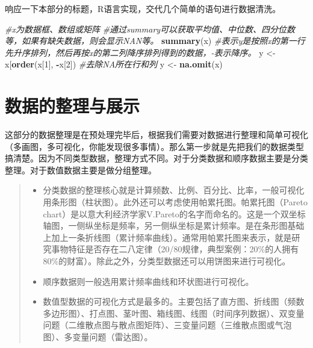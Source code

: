 \documentclass[]{ctexbook}
\newenvironment{Shaded}{\begin{snugshade}}{\end{snugshade}}
\newcommand{\CommentTok}[1]{\textcolor[rgb]{0.56,0.35,0.01}{\textit{#1}}}
\newcommand{\DecValTok}[1]{\textcolor[rgb]{0.00,0.00,0.81}{#1}}
\newcommand{\KeywordTok}[1]{\textcolor[rgb]{0.13,0.29,0.53}{\textbf{#1}}}
\newcommand{\NormalTok}[1]{#1}
\newcommand{\OperatorTok}[1]{\textcolor[rgb]{0.81,0.36,0.00}{\textbf{#1}}}
\newcommand{\StringTok}[1]{\textcolor[rgb]{0.31,0.60,0.02}{#1}}
\providecommand{\tightlist}{%
  \setlength{\itemsep}{0pt}\setlength{\parskip}{0pt}}
\begin{document}
响应一下本部分的标题，R语言实现，交代几个简单的语句进行数据清洗。

\begin{Shaded}
\begin{Highlighting}[]
\CommentTok{#x为数据框、数组或矩阵}
\CommentTok{#通过summary可以获取平均值、中位数、四分位数等，如果有缺失数据，则会显示NAN等。}
\KeywordTok{summary}\NormalTok{(x)}
\CommentTok{#表示y是按照x的第一行先升序排列，然后再按x的第二列降序排列得到的数据，-表示降序。}
\NormalTok{y <-}\StringTok{ }\NormalTok{x[}\KeywordTok{order}\NormalTok{(x[}\DecValTok{1}\NormalTok{], }\OperatorTok{-}\NormalTok{x[}\DecValTok{2}\NormalTok{])}
\CommentTok{#去除NA所在行和列}
\NormalTok{y <-}\StringTok{ }\KeywordTok{na.omit}\NormalTok{(x)}
\end{Highlighting}
\end{Shaded}

\hypertarget{ux6570ux636eux7684ux6574ux7406ux4e0eux5c55ux793a}{%
\section{数据的整理与展示}\label{ux6570ux636eux7684ux6574ux7406ux4e0eux5c55ux793a}}

这部分的数据整理是在预处理完毕后，根据我们需要对数据进行整理和简单可视化（多画图，多可视化，你能发现很多事情）。那么第一步就是先把我们的数据类型搞清楚。因为不同类型数据，整理方式不同。对于分类数据和顺序数据主要是分类整理。对于数值数据主要是做分组整理。

\begin{quote}
\begin{itemize}
\tightlist
\item
  分类数据的整理核心就是计算频数、比例、百分比、比率，一般可视化用条形图（柱状图）。此外还可以考虑使用帕累托图。帕累托图（Pareto chart）是以意大利经济学家V.Pareto的名字而命名的。这是一个双坐标轴图，一侧纵坐标是频率，另一侧纵坐标是累计频率。是在条形图基础上加上一条折线图（累计频率曲线）。通常用帕累托图来表示，就是研究事物特征是否存在二八定律（20/80规律，典型案例：20\%的人拥有80\%的财富）。除此之外，分类型数据还可以用饼图来进行可视化。
\item
  顺序数据则一般选用累计频率曲线和环状图进行可视化。
\item
  数值型数据的可视化方式是最多的。主要包括了直方图、折线图（频数多边形图）、打点图、茎叶图、箱线图、线图（时间序列数据）、双变量问题（二维散点图与散点图矩阵）、三变量问题（三维散点图或气泡图）、多变量问题（雷达图）。
\end{itemize}
\end{quote}
\end{document}

